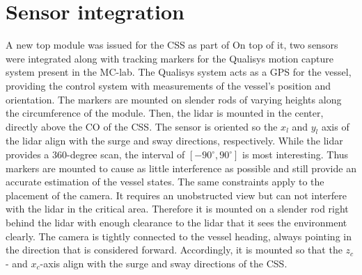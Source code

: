 \section{Sensor integration}

A new top module was issued for the CSS as part of \citet{solheim-master} On top of it, two sensors were integrated along with tracking markers for the Qualisys motion capture system present in the MC-lab. The Qualisys system acts as a GPS for the vessel, providing the control system with measurements of the vessel's position and orientation. The markers are mounted on slender rods of varying heights along the circumference of the module. Then, the lidar is mounted in the center, directly above the CO of the CSS. The sensor is oriented so the $x_l$ and $y_l$ axis of the lidar align with the surge and sway directions, respectively. While the lidar provides a 360-degree scan, the interval of  $[-90^\circ, 90^\circ]$ is most interesting. Thus markers are mounted to cause as little interference as possible and still provide an accurate estimation of the vessel states. The same constraints apply to the placement of the camera. It requires an unobstructed view but can not interfere with the lidar in the critical area. Therefore it is mounted on a slender rod right behind the lidar with enough clearance to the lidar that it sees the environment clearly. The camera is tightly connected to the vessel heading, always pointing in the direction that is considered forward. Accordingly, it is mounted so that the $z_c$- and $x_c$-axis align with the surge and sway directions of the CSS.

